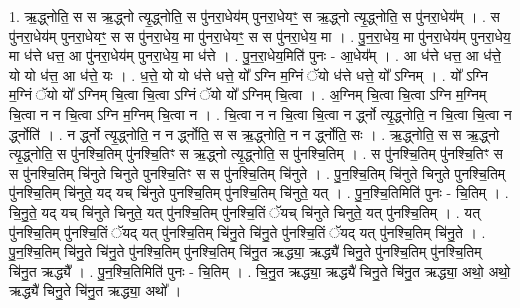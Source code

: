 \documentclass[17pt]{extarticle}
\begin{document}
1. ऋ॒द्ध्नोति॒ स स ऋ॒द्ध्नो त्यृ॒द्ध्नोति॒ स पु॑नरा॒धेय॑म् पुनरा॒धेयꣳ॒॒ स ऋ॒द्ध्नो त्यृ॒द्ध्नोति॒ स पु॑नरा॒धेय᳚म् । . स पु॑नरा॒धेय॑म् पुनरा॒धेयꣳ॒॒ स स पु॑नरा॒धेय॒ मा पु॑नरा॒धेयꣳ॒॒ स स पु॑नरा॒धेय॒ मा । . पु॒न॒रा॒धेय॒ मा पु॑नरा॒धेय॑म् पुनरा॒धेय॒ मा ध॑त्ते धत्त॒ आ पु॑नरा॒धेय॑म् पुनरा॒धेय॒ मा ध॑त्ते । . पु॒न॒रा॒धेय॒मिति॑ पुनः - आ॒धेय᳚म् । . आ ध॑त्ते धत्त॒ आ ध॑त्ते॒ यो यो ध॑त्त॒ आ ध॑त्ते॒ यः । . ध॒त्ते॒ यो यो ध॑त्ते धत्ते॒ यो᳚ ऽग्नि म॒ग्निं ॅयो ध॑त्ते धत्ते॒ यो᳚ ऽग्निम् । . यो᳚ ऽग्नि म॒ग्निं ॅयो यो᳚ ऽग्निम् चि॒त्वा चि॒त्वा ऽग्निं ॅयो यो᳚ ऽग्निम् चि॒त्वा । . अ॒ग्निम् चि॒त्वा चि॒त्वा ऽग्नि म॒ग्निम् चि॒त्वा न न चि॒त्वा ऽग्नि म॒ग्निम् चि॒त्वा न । . चि॒त्वा न न चि॒त्वा चि॒त्वा न र्द्ध्नो त्यृ॒द्ध्नोति॒ न चि॒त्वा चि॒त्वा न र्द्ध्नोति॑ । . न र्द्ध्नो त्यृ॒द्ध्नोति॒ न न र्द्ध्नोति॒ स स ऋ॒द्ध्नोति॒ न न र्द्ध्नोति॒ सः । . ऋ॒द्ध्नोति॒ स स ऋ॒द्ध्नो त्यृ॒द्ध्नोति॒ स पु॑नश्चि॒तिम् पु॑नश्चि॒तिꣳ स ऋ॒द्ध्नो त्यृ॒द्ध्नोति॒ स पु॑नश्चि॒तिम् । . स पु॑नश्चि॒तिम् पु॑नश्चि॒तिꣳ स स पु॑नश्चि॒तिम् चि॑नुते चिनुते पुनश्चि॒तिꣳ स स पु॑नश्चि॒तिम् चि॑नुते । . पु॒न॒श्चि॒तिम् चि॑नुते चिनुते पुनश्चि॒तिम् पु॑नश्चि॒तिम् चि॑नुते॒ यद् यच् चि॑नुते पुनश्चि॒तिम् पु॑नश्चि॒तिम् चि॑नुते॒ यत् । . पु॒न॒श्चि॒तिमिति॑ पुनः - चि॒तिम् । . चि॒नु॒ते॒ यद् यच् चि॑नुते चिनुते॒ यत् पु॑नश्चि॒तिम् पु॑नश्चि॒तिं ॅयच् चि॑नुते चिनुते॒ यत् पु॑नश्चि॒तिम् । . यत् पु॑नश्चि॒तिम् पु॑नश्चि॒तिं ॅयद् यत् पु॑नश्चि॒तिम् चि॑नु॒ते चि॑नु॒ते पु॑नश्चि॒तिं ॅयद् यत् पु॑नश्चि॒तिम् चि॑नु॒ते । . पु॒न॒श्चि॒तिम् चि॑नु॒ते चि॑नु॒ते पु॑नश्चि॒तिम् पु॑नश्चि॒तिम् चि॑नु॒त ऋद्ध्या॒ ऋद्ध्यै॑ चिनु॒ते पु॑नश्चि॒तिम् पु॑नश्चि॒तिम् चि॑नु॒त ऋद्ध्यै᳚ । . पु॒न॒श्चि॒तिमिति॑ पुनः - चि॒तिम् । . चि॒नु॒त ऋद्ध्या॒ ऋद्ध्यै॑ चिनु॒ते चि॑नु॒त ऋद्ध्या॒ अथो॒ अथो॒ ऋद्ध्यै॑ चिनु॒ते चि॑नु॒त ऋद्ध्या॒ अथो᳚ । \newline
\end{document}
